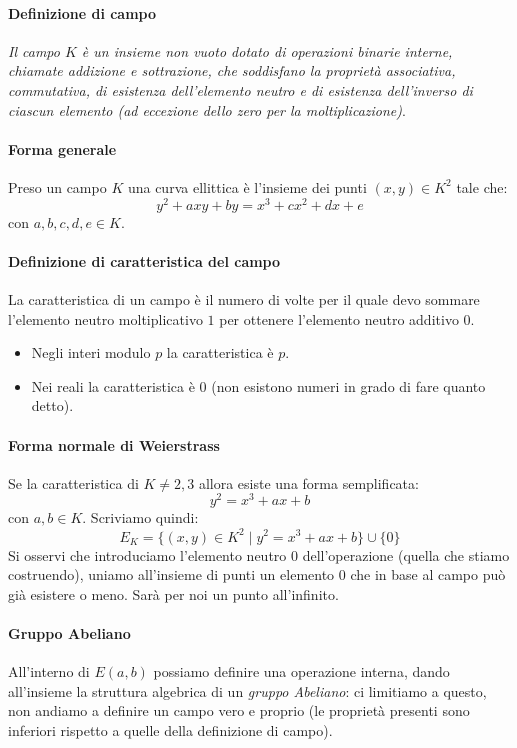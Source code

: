 \paragraph{Definizione di campo} \emph{Il campo $K$ è un insieme non vuoto dotato di operazioni binarie interne, chiamate addizione e sottrazione, che soddisfano la proprietà associativa, commutativa, di esistenza dell'elemento neutro e di esistenza dell'inverso di ciascun elemento (ad eccezione dello zero per la moltiplicazione)}. 
\paragraph{Forma generale} Preso un campo $K$ una curva ellittica è l'insieme dei punti $(x,y) \in K^2$ tale che:
$$ y^2 + axy + by = x^3 + cx^2 + dx + e $$
con $a,b,c,d,e \in K$.

\paragraph{Definizione di caratteristica del campo} La caratteristica di un campo è il numero di volte per il quale devo sommare l'elemento neutro moltiplicativo $1$ per ottenere l'elemento neutro additivo $0$.
\begin{itemize}
	\item Negli interi modulo $p$ la caratteristica è $p$.
	\item Nei reali la caratteristica è 0 (non esistono numeri in grado di fare quanto detto).
\end{itemize}

\paragraph{Forma normale di Weierstrass} Se la caratteristica di $K \neq 2, 3$ allora esiste una forma semplificata:
$$ y^2 = x^3 + ax + b $$
con $a,b \in K$. Scriviamo quindi:
$$ E_K = \{ (x,y) \in K^2 \mid y^2 = x^3 + ax +b \} \cup \{0\} $$
Si osservi che introduciamo l'elemento neutro $0$ dell'operazione (quella che stiamo costruendo), uniamo all'insieme di punti un elemento 0 che in base al campo può già esistere o meno. Sarà per noi un punto all'infinito.
\paragraph{Gruppo Abeliano} All'interno di $E(a,b)$ possiamo definire una operazione interna, dando all'insieme la struttura algebrica di un \emph{gruppo Abeliano}: ci limitiamo a questo, non andiamo a definire un campo vero e proprio (le proprietà presenti sono inferiori rispetto a quelle della definizione di campo). 

